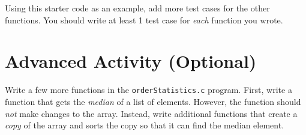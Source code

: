 \documentclass[12pt]{scrartcl}
\begin{document}
Using this starter code as an example, add more test cases for the 
other functions.  You should write at least 1 test case for 
\emph{each} function you wrote.  

\section{Advanced Activity (Optional)}

Write a few more functions in the \texttt{orderStatistics.c} program.  First,
write a function that gets the \emph{median} of a list of elements.  However, the
function should \emph{not} make changes to the array.  Instead, write additional
functions that create a \emph{copy} of the array and sorts the copy so that it can
find the median element.  
\end{document}
